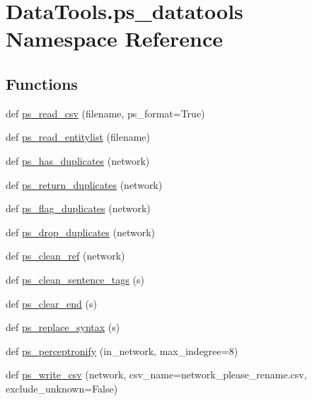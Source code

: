 \hypertarget{namespace_data_tools_1_1ps__datatools}{}\section{Data\+Tools.\+ps\+\_\+datatools Namespace Reference}
\label{namespace_data_tools_1_1ps__datatools}
\subsection*{Functions}
\begin{DoxyCompactItemize}
\item 
def \mbox{\hyperlink{namespace_data_tools_1_1ps__datatools_abadfbf72a9e40c0db140a1d52a04b2ad}{ps\+\_\+read\+\_\+csv}} (filename, ps\+\_\+format=True)
\item 
def \mbox{\hyperlink{namespace_data_tools_1_1ps__datatools_ab46896b61f3a03e9f6c6ff5ab9a1dffe}{ps\+\_\+read\+\_\+entitylist}} (filename)
\item 
def \mbox{\hyperlink{namespace_data_tools_1_1ps__datatools_a576d7bf488a40d757591fb7d2bf8a450}{ps\+\_\+has\+\_\+duplicates}} (network)
\item 
def \mbox{\hyperlink{namespace_data_tools_1_1ps__datatools_a06812dafe5446a3f89e990075e28ed9c}{ps\+\_\+return\+\_\+duplicates}} (network)
\item 
def \mbox{\hyperlink{namespace_data_tools_1_1ps__datatools_af2b808b4e4c01897013a7931711dfc1e}{ps\+\_\+flag\+\_\+duplicates}} (network)
\item 
def \mbox{\hyperlink{namespace_data_tools_1_1ps__datatools_aa87f89a53b8e244f6a35933c96d7df47}{ps\+\_\+drop\+\_\+duplicates}} (network)
\item 
def \mbox{\hyperlink{namespace_data_tools_1_1ps__datatools_afefc36ca9e31fd7b3e2fc2126f9414bd}{ps\+\_\+clean\+\_\+ref}} (network)
\item 
def \mbox{\hyperlink{namespace_data_tools_1_1ps__datatools_a9e2bdb845162499b6c7ef07092fa76e0}{ps\+\_\+clean\+\_\+sentence\+\_\+tags}} (s)
\item 
def \mbox{\hyperlink{namespace_data_tools_1_1ps__datatools_aa1f7c645ca04ccce524923614553e377}{ps\+\_\+clear\+\_\+end}} (s)
\item 
def \mbox{\hyperlink{namespace_data_tools_1_1ps__datatools_ac647fc63ad23a9826a3546ddb243aafc}{ps\+\_\+replace\+\_\+syntax}} (s)
\item 
def \mbox{\hyperlink{namespace_data_tools_1_1ps__datatools_a9df7c7cd4b349ceeefe4e9cdcc11b181}{ps\+\_\+perceptronify}} (in\+\_\+network, max\+\_\+indegree=8)
\item 
def \mbox{\hyperlink{namespace_data_tools_1_1ps__datatools_a5af601118f566110be97342fef324966}{ps\+\_\+write\+\_\+csv}} (network, csv\+\_\+name=\textquotesingle{}network\+\_\+please\+\_\+rename.\+csv\textquotesingle{}, exclude\+\_\+unknown=False)
\end{DoxyCompactItemize}


